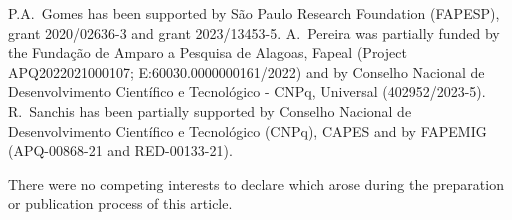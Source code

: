 \documentclass{aptpub}
\begin{document}
\fund %
P.A.~Gomes has been supported by São Paulo Research Foundation (FAPESP), grant 2020/02636-3 and grant 2023/13453-5. A.~Pereira was partially funded by the Fundação de Amparo a Pesquisa de Alagoas,  Fapeal (Project APQ2022021000107; E:60030.0000000161/2022) and by Conselho Nacional de Desenvolvimento Científico e Tecnológico - CNPq, Universal (402952/2023-5). R.~Sanchis has been partially supported by Conselho Nacional de Desenvolvimento
Científico e Tecnológico (CNPq), CAPES and by FAPEMIG (APQ-00868-21 
 and RED-00133-21).

\competing %
There were no competing interests to declare which arose during the preparation or publication process of this article.



%
%
%
\end{document}
